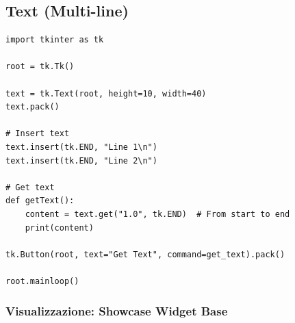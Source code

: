 \subsection{Text (Multi-line)}

\begin{lstlisting}
import tkinter as tk

root = tk.Tk()

text = tk.Text(root, height=10, width=40)
text.pack()

# Insert text
text.insert(tk.END, "Line 1\n")
text.insert(tk.END, "Line 2\n")

# Get text
def getText():
    content = text.get("1.0", tk.END)  # From start to end
    print(content)

tk.Button(root, text="Get Text", command=get_text).pack()

root.mainloop()
\end{lstlisting}

\subsubsection{Visualizzazione: Showcase Widget Base}

